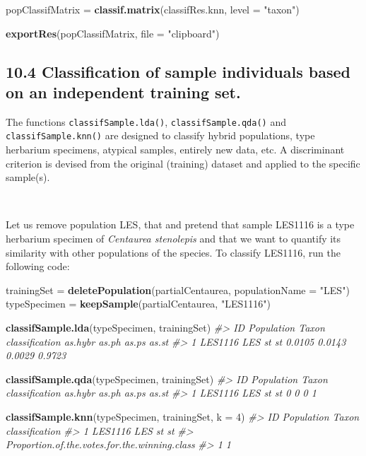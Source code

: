 \documentclass[
]{article}
\newenvironment{Shaded}{\begin{snugshade}}{\end{snugshade}}
\newcommand{\CommentTok}[1]{\textcolor[rgb]{0.56,0.35,0.01}{\textit{#1}}}
\newcommand{\DataTypeTok}[1]{\textcolor[rgb]{0.13,0.29,0.53}{#1}}
\newcommand{\DecValTok}[1]{\textcolor[rgb]{0.00,0.00,0.81}{#1}}
\newcommand{\KeywordTok}[1]{\textcolor[rgb]{0.13,0.29,0.53}{\textbf{#1}}}
\newcommand{\NormalTok}[1]{#1}
\newcommand{\StringTok}[1]{\textcolor[rgb]{0.31,0.60,0.02}{#1}}
\begin{document}
\begin{Shaded}
\begin{Highlighting}[]
\NormalTok{popClassifMatrix =}\StringTok{ }\KeywordTok{classif.matrix}\NormalTok{(classifRes.knn, }\DataTypeTok{level =} \StringTok{"taxon"}\NormalTok{)}

\KeywordTok{exportRes}\NormalTok{(popClassifMatrix, }\DataTypeTok{file =} \StringTok{"clipboard"}\NormalTok{)}
\end{Highlighting}
\end{Shaded}

\hypertarget{classification-of-sample-individuals-based-on-an-independent-training-set.}{%
\subsection{10.4 Classification of sample individuals based on an
independent training
set.}\label{classification-of-sample-individuals-based-on-an-independent-training-set.}}

The functions \texttt{classifSample.lda()}, \texttt{classifSample.qda()}
and \texttt{classifSample.knn()} are designed to classify hybrid
populations, type herbarium specimens, atypical samples, entirely new
data, etc. A discriminant criterion is devised from the original
(training) dataset and applied to the specific sample(s).

~

Let us remove population LES, that and pretend that sample LES1116 is a
type herbarium specimen of \emph{Centaurea stenolepis} and that we want
to quantify its similarity with other populations of the species. To
classify LES1116, run the following code:

\begin{Shaded}
\begin{Highlighting}[]
\NormalTok{trainingSet =}\StringTok{ }\KeywordTok{deletePopulation}\NormalTok{(partialCentaurea, }\DataTypeTok{populationName =} \StringTok{"LES"}\NormalTok{)}
\NormalTok{typeSpecimen =}\StringTok{ }\KeywordTok{keepSample}\NormalTok{(partialCentaurea, }\StringTok{"LES1116"}\NormalTok{)}

\KeywordTok{classifSample.lda}\NormalTok{(typeSpecimen, trainingSet)}
\CommentTok{#>        ID Population Taxon classification as.hybr  as.ph  as.ps  as.st}
\CommentTok{#> 1 LES1116        LES    st             st  0.0105 0.0143 0.0029 0.9723}

\KeywordTok{classifSample.qda}\NormalTok{(typeSpecimen, trainingSet)}
\CommentTok{#>        ID Population Taxon classification as.hybr as.ph as.ps as.st}
\CommentTok{#> 1 LES1116        LES    st             st       0     0     0     1}

\KeywordTok{classifSample.knn}\NormalTok{(typeSpecimen, trainingSet, }\DataTypeTok{k =} \DecValTok{4}\NormalTok{)}
\CommentTok{#>        ID Population Taxon classification}
\CommentTok{#> 1 LES1116        LES    st             st}
\CommentTok{#>   Proportion.of.the.votes.for.the.winning.class}
\CommentTok{#> 1                                             1}
\end{Highlighting}
\end{Shaded}
\end{document}
